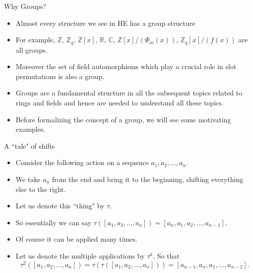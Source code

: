 \documentclass[ %
 10pt, xcolor={dvipsnames,svgnames,x11names,hyperref},
   hyperref={colorlinks=true,citecolor=green,linkcolor=DarkRed,urlcolor=ProcessBlue,anchorcolor=blue}
  ]{beamer}
\newenvironment{stepitemize}{\begin{itemize}[<+->]}{\end{itemize} }
\newcommand{\Z}{\mathbb{Z}}
\newcommand{\R}{\mathbb{R}}
\newcommand{\C}{\mathbb{C}}
\begin{document}
\begin{frame}{Why Groups?}
\begin{stepitemize}
    \item Almost every structure we see in HE has a group structure
    \item For example, $\Z$, $\Z_q$, $\Z[x]$, $\R$, $\C$, $\Z[x]/(\Phi_m(x))$, $\Z_q[x]/(f(x))$ are all groups.
    \item Moreover the set of field automorphisms which play a crucial role in slot permutations is also a group.
    \item Groups are a fundamental structure in all the subsequent topics related to rings and fields and hence are needed to understand all these topics.
    \item Before formalizing the concept of a group, we will see some motivating examples. 
\end{stepitemize}
\end{frame}

\begin{frame}{A ``tale" of shifts}
\begin{stepitemize}
    \item  Consider the following action on a sequence $a_1, a_2, \dots, a_n$.
    \item We take $a_n$ from the end and bring it to the beginning, shifting everything else to the right.
    \item Let us denote this ``thing" by $\tau$. 
    \item So essentially we can say $\tau([a_1, a_2, \dots, a_n]) = [a_n, a_1, a_2, \dots, a_{n-1}]$.
    \item Of course it can be applied many times. 
    \item Let us denote the multiple applications by $\tau^k$. So that 
    $$\tau^2([a_1, a_2, \dots, a_n]) = \tau(\tau([a_1, a_2, \dots, a_n]))=[a_{n-1},a_{n},a_1, \dots, a_{n-2}].$$
\end{stepitemize}
\end{frame}
\end{document}

